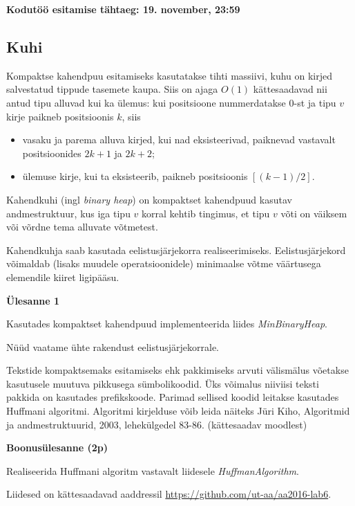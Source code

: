 \documentclass[a4paper]{article}
\begin{document}
\textbf{Kodutöö esitamise tähtaeg: 19. november, 23:59}

{\center
\subsection*{Kuhi}
}

Kompaktse kahendpuu esitamiseks kasutatakse tihti massiivi, kuhu on kirjed
salvestatud tippude tasemete kaupa. Siis on ajaga $O(1)$ kättesaadavad nii antud
tipu alluvad kui ka ülemus: kui positsioone nummerdatakse 0-st ja tipu $v$
kirje paikneb positsioonis $k$, siis

\begin{itemize}
\item vasaku ja parema alluva kirjed, kui nad eksisteerivad, paiknevad vastavalt
positsioonides $2k + 1$ ja $2k + 2$;
\item ülemuse kirje, kui ta eksisteerib, paikneb positsioonis $[(k - 1) / 2]$.
\end{itemize}

Kahendkuhi (ingl \textit{binary heap}) on kompaktset kahendpuud kasutav andmestruktuur, kus iga tipu $v$ korral kehtib tingimus, et tipu $v$ võti on väiksem või võrdne tema alluvate võtmetest. 

Kahendkuhja saab kasutada eelistusjärjekorra realiseerimiseks. Eelistusjärjekord võimaldab (lisaks muudele operatsioonidele) minimaalse võtme väärtusega elemendile kiiret ligipääsu. 
  
\begin{problem}
\textbf{Ülesanne 1}

Kasutades kompaktset kahendpuud implementeerida liides \textit{MinBinaryHeap}.
\end{problem}

Nüüd vaatame ühte rakendust eelistusjärjekorrale.
 
Tekstide kompaktsemaks esitamiseks ehk pakkimiseks arvuti välismälus võetakse
kasutusele muutuva pikkusega sümbolikoodid. Üks võimalus niiviisi
teksti pakkida on kasutades prefikskoode. Parimad sellised koodid leitakse
kasutades Huffmani algoritmi. Algoritmi kirjelduse võib leida näiteks Jüri Kiho,
Algoritmid ja andmestruktuurid, 2003, lehekülgedel 83-86. (kättesaadav moodlest)

\begin{problem}
\textbf{Boonusülesanne (2p)}

Realiseerida Huffmani algoritm vastavalt liidesele \textit{HuffmanAlgorithm}.
\end{problem}

Liidesed on kättesaadavad aaddressil \url{https://github.com/ut-aa/aa2016-lab6}.
\end{document}
